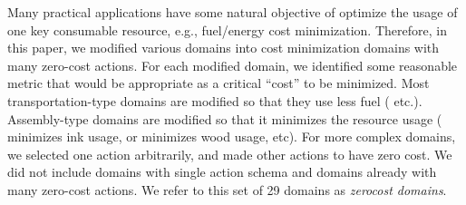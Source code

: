 
Many practical applications have some natural
objective of optimize the usage of one key consumable resource, e.g., fuel/energy cost minimization.
Therefore, in this paper, we modified various domains
into cost minimization domains with many zero-cost actions.
For each modified domain, we identified some reasonable metric that would be appropriate as a 
critical ``cost'' to be minimized.
Most transportation-type domains are modified so that they use less
fuel ( etc.). Assembly-type domains are modified so that it minimizes the
resource usage ( minimizes ink usage, or 
minimizes wood usage, etc). For more complex domains, we selected one action
arbitrarily, and made other actions to have zero cost. We did not
include domains with single action schema and domains already with many
zero-cost actions.
We refer to this set of 29 domains as \emph{zerocost domains}.


